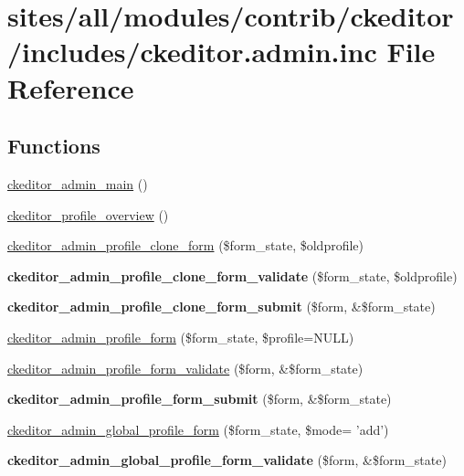 \hypertarget{ckeditor_8admin_8inc}{
\section{sites/all/modules/contrib/ckeditor/includes/ckeditor.admin.inc File Reference}
\label{ckeditor_8admin_8inc}
}
\subsection*{Functions}
\begin{CompactItemize}
\item 
\hyperlink{ckeditor_8admin_8inc_68d8d3c0cc2912cbcb346d61da5b4447}{ckeditor\_\-admin\_\-main} ()
\item 
\hyperlink{ckeditor_8admin_8inc_1e2b750a7693c88202d5148fb946d1a0}{ckeditor\_\-profile\_\-overview} ()
\item 
\hyperlink{ckeditor_8admin_8inc_30a1df72aabcda54c300c0a046c89b88}{ckeditor\_\-admin\_\-profile\_\-clone\_\-form} (\$form\_\-state, \$oldprofile)
\item 
\hypertarget{ckeditor_8admin_8inc_25ea7e324b91e19b5c4af1521fa04811}{
\textbf{ckeditor\_\-admin\_\-profile\_\-clone\_\-form\_\-validate} (\$form\_\-state, \$oldprofile)}
\label{ckeditor_8admin_8inc_25ea7e324b91e19b5c4af1521fa04811}

\item 
\hypertarget{ckeditor_8admin_8inc_2d6cee7367150a588b5163f2426f3d45}{
\textbf{ckeditor\_\-admin\_\-profile\_\-clone\_\-form\_\-submit} (\$form, \&\$form\_\-state)}
\label{ckeditor_8admin_8inc_2d6cee7367150a588b5163f2426f3d45}

\item 
\hyperlink{ckeditor_8admin_8inc_4830c622a5240191b4ab1ac7ee60c90e}{ckeditor\_\-admin\_\-profile\_\-form} (\$form\_\-state, \$profile=NULL)
\item 
\hyperlink{ckeditor_8admin_8inc_613b4fca873bca4e3cf3236326371005}{ckeditor\_\-admin\_\-profile\_\-form\_\-validate} (\$form, \&\$form\_\-state)
\item 
\hypertarget{ckeditor_8admin_8inc_2f9791ba20b18bed95c6a8d97812a8bf}{
\textbf{ckeditor\_\-admin\_\-profile\_\-form\_\-submit} (\$form, \&\$form\_\-state)}
\label{ckeditor_8admin_8inc_2f9791ba20b18bed95c6a8d97812a8bf}

\item 
\hyperlink{ckeditor_8admin_8inc_a0cc22572ab6628e086774f428c3c975}{ckeditor\_\-admin\_\-global\_\-profile\_\-form} (\$form\_\-state, \$mode= 'add')
\item 
\hypertarget{ckeditor_8admin_8inc_18fa071ed8d5d290f080cdf9cd87aa3b}{
\textbf{ckeditor\_\-admin\_\-global\_\-profile\_\-form\_\-validate} (\$form, \&\$form\_\-state)}
\label{ckeditor_8admin_8inc_18fa071ed8d5d290f080cdf9cd87aa3b}


\end{CompactItemize}
